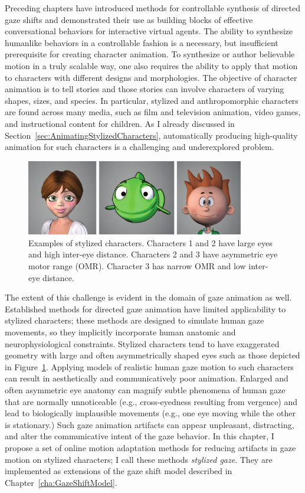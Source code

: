 Preceding chapters have introduced methods for controllable synthesis of directed gaze shifts and demonstrated their use as building blocks of effective conversational behaviors for interactive virtual agents. The ability to synthesize humanlike behaviors in a controllable fashion is a necessary, but insufficient prerequisite for creating character animation.
To synthesize or author believable motion in a truly scalable way, one also requires the ability to apply that motion to characters with different designs and morphologies. The objective of character animation is to tell stories and those stories can involve characters of varying shapes, sizes, and species. In particular, stylized and anthropomorphic characters are found across many media, such as film and television animation, video games, and instructional content for children. As I already discussed in Section~\ref{sec:AnimatingStylizedCharacters}, automatically producing high-quality animation for such characters is a challenging and underexplored problem.

\begin{figure}
\centering
\includegraphics[width=0.85\textwidth]{stylizedgaze/Figures/StylizedCharacterExamples-small.pdf}
\caption{Examples of stylized characters. Characters 1 and 2 have large eyes and high inter-eye distance. Characters 2 and 3 have asymmetric eye motor range (OMR). Character 3 has narrow OMR and low inter-eye distance.}
\label{fig:StylizedCharacterExamples}
\end{figure}

The extent of this challenge is evident in the domain of gaze animation as well. Established methods for directed gaze animation have limited applicability to stylized characters; these methods are designed to simulate human gaze movements, so they implicitly incorporate human anatomic and neurophysiological constraints. Stylized characters tend to have exaggerated geometry with large and often asymmetrically shaped eyes such as those depicted in Figure~\ref{fig:StylizedCharacterExamples}. Applying models of realistic human gaze motion to such characters can result in aesthetically and communicatively poor animation. Enlarged and often asymmetric eye anatomy can magnify subtle phenomena of human gaze that are normally unnoticeable (e.g., cross-eyedness resulting from vergence) and lead to biologically implausible movements (e.g., one eye moving while the other is stationary.) Such gaze animation artifacts can appear unpleasant, distracting, and alter the communicative intent of the gaze behavior. In this chapter, I propose a set of online motion adaptation methods for reducing artifacts in gaze motion on stylized characters; I call these methods \emph{stylized gaze}. They are implemented as extensions of the gaze shift model described in Chapter~\ref{cha:GazeShiftModel}.

